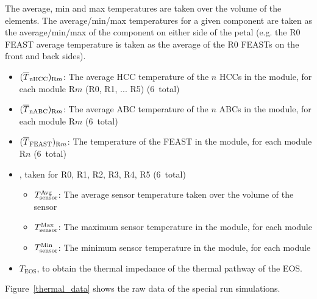 The average, min and max temperatures are taken over the volume of the elements.
%
The average/min/max temperatures for a given component are taken as the average/min/max of the
component on either side of the petal (e.g. the R0 FEAST average temperature is taken as the average of
the R0 FEASTs on the front and back sides).

\begin{itemize}
\item $(\overline{T}_\text{nHCC})_{{\text{R}m}}$: The average HCC temperature of the $n$ HCCs in the module, for each module R$m$ (R0, R1, ... R5) (6~total)
\item $(\overline{T}_\text{nABC})_{{\text{R}m}}$: The average ABC temperature of the $n$ ABCs in the module, for each module R$m$ (6~total)
\item $(\overline{T}_\text{FEAST})_{{\text{R}m}}$: The temperature of the FEAST in the module, for each module R$n$ (6~total)
\item \tsensor, taken for R0, R1, R2, R3, R4, R5 (6~total)
\begin{itemize}
  \item $T_\text{sensor}^\text{Avg}$: The average sensor temperature taken over the volume of the sensor
  \item $T_\text{sensor}^\text{Max}$: The maximum sensor temperature in the module, for each module
  \item $T_\text{sensor}^\text{Min}$: The minimum sensor temperature in the module, for each module
\end{itemize}
\item $T_\text{EOS}$, to obtain the thermal impedance of the thermal pathway of the EOS.
\end{itemize}

Figure~\ref{thermal_data} shows the raw data of the special run simulations. 

